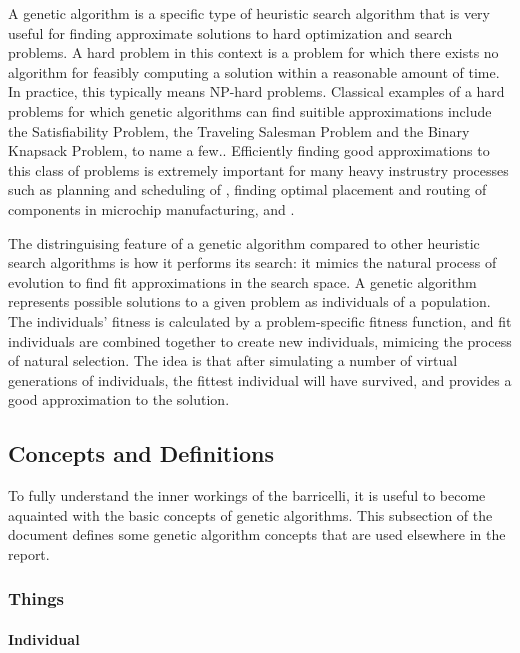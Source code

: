 A genetic algorithm is a specific type of heuristic search algorithm that is very useful for finding approximate solutions to hard optimization and search problems.
A hard problem in this context is a problem for which there exists no algorithm for feasibly computing a solution within a reasonable amount of time.
In practice, this typically means NP-hard problems.
Classical examples of a hard problems for which genetic algorithms can find suitible approximations include the Satisfiability Problem, the Traveling Salesman Problem and the Binary Knapsack Problem, to name a few.\cn{}.
Efficiently finding good approximations to this class of problems is extremely important for many heavy instrustry processes such as planning and scheduling of , finding optimal placement and routing of components in microchip manufacturing, and .

The distringuising feature of a genetic algorithm compared to other heuristic search algorithms is how it performs its search: it mimics the natural process of evolution to find fit approximations in the search space.
A genetic algorithm represents possible solutions to a given problem as individuals of a population.
The individuals' fitness is calculated by a problem-specific fitness function, and fit individuals are combined together to create new individuals, mimicing the process of natural selection.
The idea is that after simulating a number of virtual generations of individuals, the fittest individual will have survived, and provides a good approximation to the solution.

\subsection{Concepts and Definitions}

To fully understand the inner workings of the \Gls{barricelli}, it is useful to become aquainted with the basic concepts of genetic algorithms.
This subsection of the document defines some genetic algorithm concepts that are used elsewhere in the report.

\subsubsection{Things}


\paragraph{Individual}


